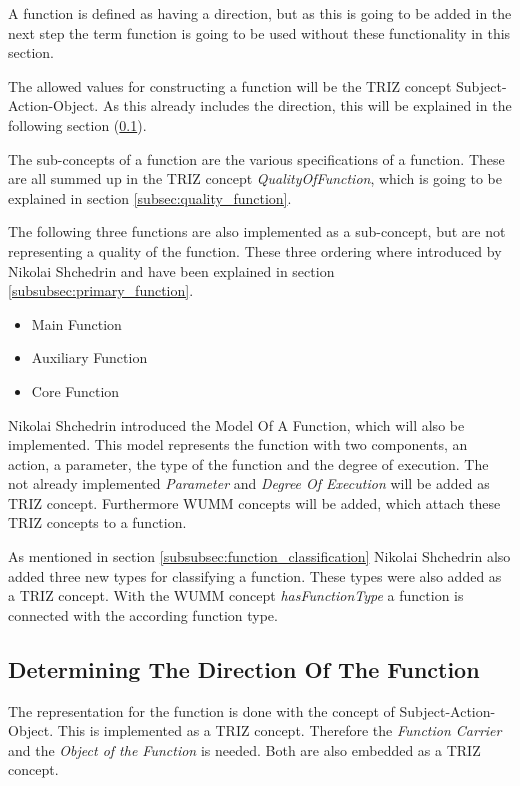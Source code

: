 A function is defined as having a direction, but as this is going to be added in the next step the term function is going to be used without these functionality in this section.

The allowed values for constructing a function will be the TRIZ concept Subject-Action-Object.
As this already includes the direction, this will be explained in the following section (\ref{subsec:direction_function}).

The sub-concepts of a function are the various specifications of a function. 
These are all summed up in the TRIZ concept \textit{QualityOfFunction}, which is going to be explained in section \ref{subsec:quality_function}.

The following three functions are also implemented as a sub-concept, but are not representing a quality of the function. 
These three ordering where introduced by Nikolai Shchedrin and have been explained in section \ref{subsubsec:primary_function}.

\begin{itemize}[noitemsep]
    \item Main Function
    \item Auxiliary Function
    \item Core Function
\end{itemize}

Nikolai Shchedrin introduced the Model Of A Function, which will also be implemented.
This model represents the function with two components, an action, a parameter, the type of the function and the degree of execution. 
The not already implemented \textit{Parameter} and \textit{Degree Of Execution} will be added as TRIZ concept. 
Furthermore WUMM concepts will be added, which attach these TRIZ concepts to a function.

As mentioned in section \ref{subsubsec:function_classification} Nikolai Shchedrin also added three new types for classifying a function.
These types were also added as a TRIZ concept. 
With the WUMM concept \textit{hasFunctionType} a function is connected with the according function type.

\subsection{Determining The Direction Of The Function}
\label{subsec:direction_function}

The representation for the function is done with the concept of Subject-Action-Object. 
This is implemented as a TRIZ concept. 
Therefore the \textit{Function Carrier} and the \textit{Object of the Function} is needed.
Both are also embedded as a TRIZ concept.


